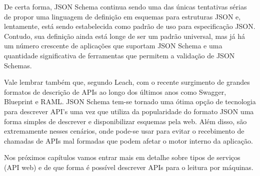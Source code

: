 \begin{table}[ht!]
  \centering
  \caption{Subconjunto de chaves especiais JSON Schema}
\end{table}

De certa forma, JSON Schema continua sendo uma das únicas tentativas sérias de propor uma linguagem de definição em esquemas para estruturas JSON e, lentamente, está sendo estabelecida como padrão de uso para especificação JSON. Contudo, sua definição ainda está longe de ser um padrão universal, mas já há um número crescente de aplicações que suportam JSON Schema e uma quantidade significativa de ferramentas que permitem a validação de JSON Schemas. \cite{PezoaEtAl2016}

Vale lembrar também que, segundo Leach, com o recente surgimento de grandes formatos de descrição de APIs ao longo dos últimos anos como Swagger, Blueprint e RAML. JSON Schema tem-se tornado uma ótima opção de tecnologia para descrever API's uma vez que utiliza da popularidade do formato JSON uma forma simples de descrever e disponibilizar esquemas pela web. Além disso, são extremamente nesses cenários, onde pode-se usar para evitar o recebimento de chamadas de APIs mal formadas que podem afetar o motor interno da aplicação. \cite{Leach2014} \cite{PezoaEtAl2016}

Nos próximos capítulos vamos entrar mais em detalhe sobre tipos de serviços (API web) e de que forma é possível descrever APIs para o leitura por máquinas.
